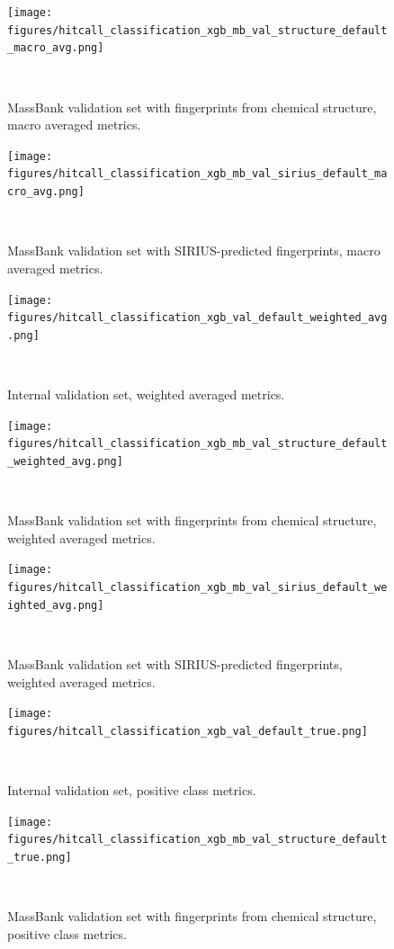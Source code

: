 \begin{figure}
  \centering
  \texttt{[image: figures/hitcall\_classification\_xgb\_mb\_val\_structure\_default\_macro\_avg.png]}
  \caption{MassBank validation set with fingerprints from chemical structure, macro averaged metrics.}
~\label{fig:hitcall_classification_xgb_mb_val_structure_default_macro_avg}
\end{figure}

\begin{figure}
  \centering
  \texttt{[image: figures/hitcall\_classification\_xgb\_mb\_val\_sirius\_default\_macro\_avg.png]}
  \caption{MassBank validation set with SIRIUS-predicted fingerprints, macro averaged metrics.}
~\label{fig:hitcall_classification_xgb_mb_val_sirius_default_macro_avg}
\end{figure}

\begin{figure}
  \centering
  \texttt{[image: figures/hitcall\_classification\_xgb\_val\_default\_weighted\_avg.png]}
  \caption{Internal validation set, weighted averaged metrics.}
~\label{fig:hitcall_classification_xgb_val_default_weighted_avg}
\end{figure}

\begin{figure}
  \centering
  \texttt{[image: figures/hitcall\_classification\_xgb\_mb\_val\_structure\_default\_weighted\_avg.png]}
  \caption{MassBank validation set with fingerprints from chemical structure, weighted averaged metrics.}
~\label{fig:hitcall_classification_xgb_mb_val_structure_default_weighted_avg}
\end{figure}

\begin{figure}
  \centering
  \texttt{[image: figures/hitcall\_classification\_xgb\_mb\_val\_sirius\_default\_weighted\_avg.png]}
  \caption{MassBank validation set with SIRIUS-predicted fingerprints, weighted averaged metrics.}
~\label{fig:hitcall_classification_xgb_mb_val_sirius_default_weighted_avg}
\end{figure}


\begin{figure}
  \centering
  \texttt{[image: figures/hitcall\_classification\_xgb\_val\_default\_true.png]}
  \caption{Internal validation set, positive class metrics.}
~\label{fig:hitcall_classification_xgb_val_default_true}
\end{figure}

\begin{figure}
  \centering
  \texttt{[image: figures/hitcall\_classification\_xgb\_mb\_val\_structure\_default\_true.png]}
  \caption{MassBank validation set with fingerprints from chemical structure, positive class metrics.}
~\label{fig:hitcall_classification_xgb_mb_val_structure_default_true}
\end{figure}

